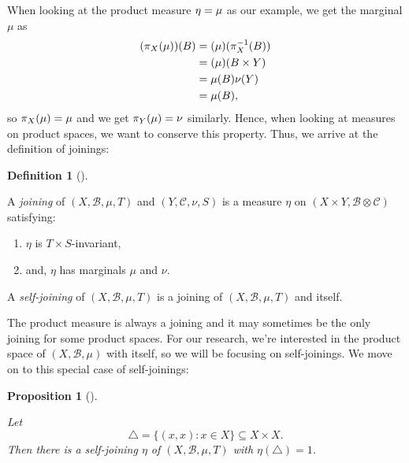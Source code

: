 \documentclass[
  british,
]{article}
\providecommand{\tightlist}{%
  \setlength{\itemsep}{0pt}\setlength{\parskip}{0pt}}
\theoremstyle{definition}
\newtheorem{definition}{Definition}[section]
\theoremstyle{plain}
\newtheorem{proposition}{Proposition}[section]
\theoremstyle{remark}
\newcommand{\Measure}{{\mu}}
\newcommand{\ProjectionMap}[1][\vphantom{}]{{\pi}_{#1}}
\newcommand{\SigmaAlgebra}[1]{{\mathscr{#1}}}
\begin{document}
When looking at the product measure \(\eta=\ProductMeasure\) as our
example, we get the marginal \(\Measure\) as \begin{align*}
    (\ProjectionMap[X](\ProductMeasure))(B)&=(\ProductMeasure)(\ProjectionMap[X]^{-1}(B))
    \\&=(\ProductMeasure)(B\times Y)
    \\&=\Measure(B)\nu(Y)
    \\&=\Measure(B),
\end{align*} so \(\ProjectionMap[X](\ProductMeasure)=\Measure\) and we
get \(\ProjectionMap[Y](\ProductMeasure)=\nu\) similarly. Hence, when
looking at measures on product spaces, we want to conserve this
property. Thus, we arrive at the definition of joinings:

\begin{definition}[]\protect\hypertarget{def-Joinings}{}\label{def-Joinings}

A \emph{joining} of \((X,\SigmaAlgebra{B},\Measure,T)\) and
\((Y,\SigmaAlgebra{C},\nu,S)\) is a measure \(\eta\) on
\((X\times Y,\SigmaAlgebra{B}\otimes\SigmaAlgebra{C})\) satisfying:

\begin{enumerate}
\def\labelenumi{\arabic{enumi}.}
\tightlist
\item
  \(\eta\) is \(T\times S\)-invariant,
\item
  and, \(\eta\) has marginals \(\Measure\) and \(\nu\).
\end{enumerate}

A \emph{self-joining} of \((X,\SigmaAlgebra{B},\Measure,T)\) is a
joining of \((X,\SigmaAlgebra{B},\Measure,T)\) and itself.

\end{definition}

The product measure is always a joining and it may sometimes be the only
joining for some product spaces. For our research, we're interested in
the product space of \((X,\SigmaAlgebra{B},\Measure)\) with itself, so
we will be focusing on self-joinings. We move on to this special case of
self-joinings:

\begin{proposition}[]\protect\hypertarget{prp-DiagonalJoining}{}\label{prp-DiagonalJoining}

Let \[\triangle=\{(x,x):x\in X\}\subseteq X\times X.\] Then there is a
self-joining \(\eta\) of \((X,\SigmaAlgebra{B},\Measure,T)\) with
\(\eta(\triangle)=1\).

\end{proposition}
\end{document}
